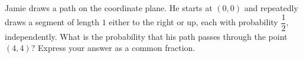 Jamie draws a path on the coordinate plane. He starts at $(0,0)$ and repeatedly draws a segment of length $1$ either to the right or up, each with probability $\dfrac{1}{2}$, independently. What is the probability that his path passes through the point $(4,4)$? Express your answer as a common fraction.
